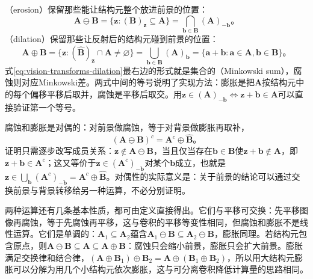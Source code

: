 （erosion）保留那些能让结构元整个放进前景的位置：
\begin{equation}
  \bm{A}\ominus\bm{B}=\{\bm{z}:(\bm{B})_{\bm{z}}\subseteq\bm{A}\}
  =\bigcap_{\bm{b}\in\bm{B}}(\bm{A})_{-\bm{b}}\text{。}
  \label{eq:vision-transforms-erosion}
\end{equation}
（dilation）保留那些让反射后的结构元碰到前景的位置：
\begin{equation}
  \bm{A}\oplus\bm{B}=\{\bm{z}:(\hat{\bm{B}})_{\bm{z}}\cap\bm{A}\neq\varnothing\}
  =\bigcup_{\bm{b}\in\bm{B}}(\bm{A})_{\bm{b}}
  =\{\bm{a}+\bm{b}:\bm{a}\in\bm{A},\bm{b}\in\bm{B}\}\text{。}
  \label{eq:vision-transforms-dilation}
\end{equation}
式\eqref{eq:vision-transforms-dilation}最右边的形式就是集合的（Minkowski sum），腐蚀则对应Minkowski差。两式中间的等号说明了实现方法：膨胀是把$\bm{A}$按结构元中的每个偏移平移后取并，腐蚀是平移后取交。用$\bm{z}\in(\bm{A})_{-\bm{b}}\Leftrightarrow\bm{z}+\bm{b}\in\bm{A}$可以直接验证第一个等号。

腐蚀和膨胀是对偶的：对前景做腐蚀，等于对背景做膨胀再取补，
\begin{equation}
  (\bm{A}\ominus\bm{B})^{c}=\bm{A}^{c}\oplus\hat{\bm{B}}\text{。}
  \label{eq:vision-transforms-duality}
\end{equation}
证明只需逐步改写成员关系：$\bm{z}\notin\bm{A}\ominus\bm{B}$，当且仅当存在$\bm{b}\in\bm{B}$使$\bm{z}+\bm{b}\notin\bm{A}$，即$\bm{z}+\bm{b}\in\bm{A}^{c}$；这又等价于$\bm{z}\in(\bm{A}^{c})_{-\bm{b}}$对某个$\bm{b}$成立，也就是$\bm{z}\in\bigcup_{\bm{b}}(\bm{A}^{c})_{-\bm{b}}=\bm{A}^{c}\oplus\hat{\bm{B}}$。对偶性的实际意义是：关于前景的结论可以通过交换前景与背景转移给另一种运算，不必分别证明。

两种运算还有几条基本性质，都可由定义直接得出。它们与平移可交换：先平移图像再腐蚀，等于先腐蚀再平移，这与卷积的平移等变性相同，但腐蚀和膨胀不是线性运算。它们是单调的：$\bm{A}_1\subseteq\bm{A}_2$蕴含$\bm{A}_1\ominus\bm{B}\subseteq\bm{A}_2\ominus\bm{B}$，膨胀同理。若结构元包含原点，则$\bm{A}\ominus\bm{B}\subseteq\bm{A}\subseteq\bm{A}\oplus\bm{B}$：腐蚀只会缩小前景，膨胀只会扩大前景。膨胀满足交换律和结合律，$(\bm{A}\oplus\bm{B}_1)\oplus\bm{B}_2=\bm{A}\oplus(\bm{B}_1\oplus\bm{B}_2)$，所以用大结构元膨胀可以分解为用几个小结构元依次膨胀，这与可分离卷积降低计算量的思路相同。

